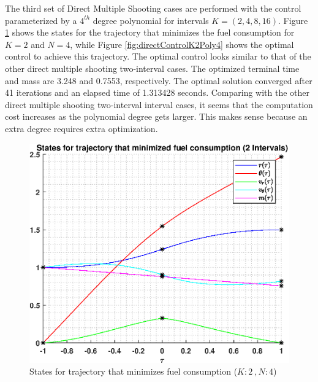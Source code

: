 \documentclass[]{article}
\begin{document}
\FloatBarrier

The third set of Direct Multiple Shooting cases are performed with the control parameterized by a \(4^{th}\) degree polynomial for intervals \(K = (2,4,8,16)\). Figure \ref{fig:directStatesK2Poly4} shows the states for the trajectory that minimizes the fuel consumption for \(K = 2\) and  \(N = 4\), while Figure \ref{fig:directControlK2Poly4} shows the optimal control to achieve this trajectory. The optimal control looks similar to that of the other direct multiple shooting two-interval cases. The optimized terminal time and mass are 3.248 and 0.7553, respectively. The optimal solution converged after 41 iterations and an elapsed time of 1.313428 seconds. Comparing with the other direct multiple shooting two-interval interval cases, it seems that the computation cost increases as the polynomial degree gets larger. This makes sense because an extra degree requires extra optimization.
\begin{figure}
	\centering
	\includegraphics[scale=0.75]{directStatesK2Poly4.eps}
	\caption{States for trajectory that minimizes fuel consumption (\(K:2\ , N:4\))}
	\label{fig:directStatesK2Poly4}
\end{figure}
\end{document}
